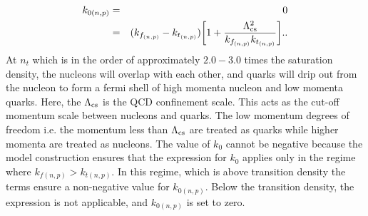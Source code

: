 \begin{eqnarray}
	k_{0(n,p)} &=& 0 \\
	&=& (k_{f_{(n,p)}}-k_{t_{(n,p)}})\bigg[1+ \frac{\Lambda_{\rm cs}^2}{k_{f_{(n,p)}}k_{t_{(n,p)}}}\bigg].
	
	.
\end{eqnarray}
At $n_t$ which is in the order of approximately $2.0 -3.0$ times the saturation density, the nucleons will overlap with each other, and quarks will drip out from the nucleon to form a fermi shell of high momenta nucleon and low momenta quarks. 
Here, the $\Lambda_{\rm cs}$ is the QCD confinement scale. This acts as the cut-off momentum scale between nucleons and quarks. The low momentum degrees of freedom i.e. the momentum less than  $\Lambda_{\rm cs}$ are treated as quarks while higher momenta are treated as nucleons.  The value of $k_0$ cannot be negative because the model construction ensures that the expression for $k_0$ applies only in the regime where $k_{f(n,p)} > k_{t(n,p)}$. In this regime, which is above transition density the terms ensure a non-negative value for $k_{0(n,p)}$. Below the transition density, the expression is not applicable, and  $k_{0(n,p)}$ is set to zero. 

